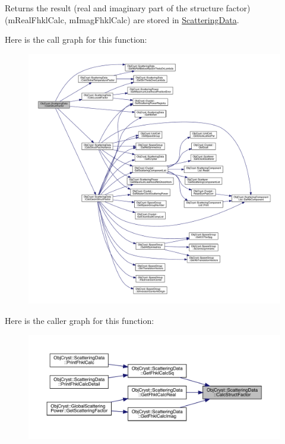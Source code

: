 \begin{DoxyReturn}{Returns}
the result (real and imaginary part of the structure factor) (m\+Real\+Fhkl\+Calc, m\+Imag\+Fhkl\+Calc) are stored in \mbox{\hyperlink{class_obj_cryst_1_1_scattering_data}{Scattering\+Data}}. 
\end{DoxyReturn}
Here is the call graph for this function\+:
\nopagebreak
\begin{figure}[H]
\begin{center}
\leavevmode
\includegraphics[width=350pt]{class_obj_cryst_1_1_scattering_data_aaf82b283529262aa6b0ec547e23c6b6d_cgraph}
\end{center}
\end{figure}
Here is the caller graph for this function\+:
\nopagebreak
\begin{figure}[H]
\begin{center}
\leavevmode
\includegraphics[width=350pt]{class_obj_cryst_1_1_scattering_data_aaf82b283529262aa6b0ec547e23c6b6d_icgraph}
\end{center}
\end{figure}
\mbox{\label{class_obj_cryst_1_1_scattering_data_a5e2175dbe3023c1f498091006b01a596}} 
